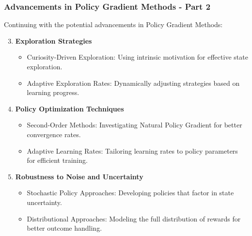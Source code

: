 \documentclass[aspectratio=169]{beamer}
\begin{document}
\begin{frame}[fragile]
    \frametitle{Advancements in Policy Gradient Methods - Part 2}
    Continuing with the potential advancements in Policy Gradient Methods:
    
    \begin{enumerate}
        \setcounter{enumi}{2} %
        \item \textbf{Exploration Strategies}
        \begin{itemize}
            \item Curiosity-Driven Exploration: Using intrinsic motivation for effective state exploration.
            \item Adaptive Exploration Rates: Dynamically adjusting strategies based on learning progress.
        \end{itemize}
        
        \item \textbf{Policy Optimization Techniques}
        \begin{itemize}
            \item Second-Order Methods: Investigating Natural Policy Gradient for better convergence rates.
            \item Adaptive Learning Rates: Tailoring learning rates to policy parameters for efficient training.
        \end{itemize}
        
        \item \textbf{Robustness to Noise and Uncertainty}
        \begin{itemize}
            \item Stochastic Policy Approaches: Developing policies that factor in state uncertainty.
            \item Distributional Approaches: Modeling the full distribution of rewards for better outcome handling.
        \end{itemize}
    \end{enumerate}
\end{frame}
\end{document}
